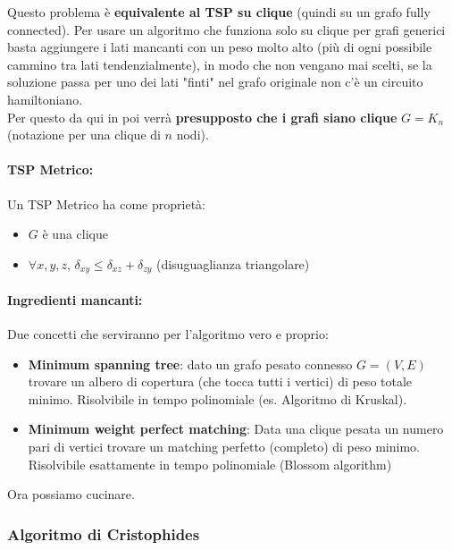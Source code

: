 \documentclass[11pt]{article}
\begin{document}
	Questo problema è \textbf{equivalente al TSP su clique} (quindi su un grafo fully connected). Per usare un algoritmo che funziona solo su clique per grafi generici basta aggiungere i lati mancanti con un peso molto alto (più di ogni possibile cammino tra lati tendenzialmente), in modo che non vengano mai scelti, se la soluzione passa per uno dei lati "finti" nel grafo originale non c'è un circuito hamiltoniano.\\
	
	Per questo da qui in poi verrà \textbf{presupposto che i grafi siano clique} $G = K_n$ (notazione per una clique di $n$ nodi).\\
	
	\newpage
	
	\paragraph{TSP Metrico:} Un TSP Metrico ha come proprietà:
	\begin{itemize}
		\item $G$ è una clique 
		\item $\forall x,y,z$, $\delta_{xy} \leq \delta_{xz} + \delta_{zy}$ (disuguaglianza triangolare)
	\end{itemize}
	
	\nn
	
	\paragraph{Ingredienti mancanti: } Due concetti che serviranno per l'algoritmo vero e proprio:
	\begin{itemize}
		\item \textbf{Minimum spanning tree}: dato un grafo pesato connesso $G = (V,E)$ trovare un albero di copertura (che tocca tutti i vertici) di peso totale minimo. Risolvibile in tempo polinomiale (es. Algoritmo di Kruskal).\\
		
		\item \textbf{Minimum weight perfect matching}: Data una clique pesata un numero pari di vertici trovare un matching perfetto (completo) di peso minimo. Risolvibile esattamente in tempo polinomiale (Blossom algorithm)
	\end{itemize}
	
	Ora possiamo cucinare.\\
	
	\newpage
	
	\subsubsection{Algoritmo di Cristophides}
	
\end{document}
